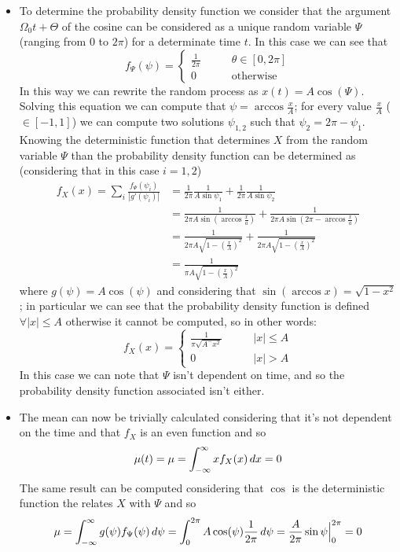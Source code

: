 	\begin{itemize}
		\item To determine the probability density function we consider that the argument $\Omega_0 t + \Theta$ of the cosine can be considered as a unique random variable $\Psi$ (ranging from $0$ to $2\pi$) for a determinate time $t$. In this case we can see that\[ f_\Psi(\psi) = \begin{cases}
			\frac 1 {2\pi} \qquad & \theta \in [0,2\pi] \\
			0 & \textrm{otherwise}
		\end{cases}\]
		In this way we can rewrite the random process as $x(t) = A \cos(\Psi)$. Solving this equation we can compute that $\psi = \arccos \frac xA$; for every value $\frac xA$ ($\in [-1,1]$) we can compute two solutions $\psi_{1,2}$ such that $\psi_2 = 2\pi - \psi_1$. Knowing the deterministic function that determines $X$ from the random variable $\Psi$ than the probability density function can be determined as (considering that in this case $i=1,2$)
		\begin{align*}
			f_X(x) = \sum_i \frac{f_\Psi(\psi_i)}{|g'(\psi_i)|} & = \frac{1}{2\pi}  \frac{1}{A\sin \psi_1} + \frac{1}{2\pi} \frac{1}{A\sin\psi_2} \\
			& = \frac{1}{2\pi A\sin \left(\arccos \frac{x}{a}\right)} + \frac{1}{2\pi A\sin \left(2\pi - \arccos \frac{x}{a}\right)} \\
			& = \frac{1}{2\pi A\sqrt{1 - \left(\frac x A\right)^2}} + \frac{1}{2\pi A\sqrt{1 - \left(\frac x A\right)^2}} \\ 
			&  = \frac{1}{\pi A\sqrt{1 - \left(\frac x A\right)^2}}
		\end{align*}
		where $g(\psi) =A \cos(\psi)$ and considering that $\sin(\arccos x) = \sqrt{1-x^2}$; in particular we can see that the probability density function is defined $\forall |x|\leq A$ otherwise it cannot be computed, so in other words:
		\[ f_X(x) = \begin{cases}
			\frac 1 {\pi \sqrt{A^-x^2}} \qquad & |x| \leq A \\ 0 & |x| > A
		\end{cases} \]
		In this case we can note that $\Psi$ isn't dependent on time, and so the probability density function associated isn't either.
		
		\item The mean can now be trivially calculated considering that it's not dependent on the time and that $f_X$ is an even function and so
		\[ \mu(t) = \mu= \int_{-\infty}^\infty x f_X(x)\, dx = 0\]
		The same result can be computed considering that $\cos$ is the deterministic function the relates $X$ with $\Psi$ and so
		\[ \mu = \int_{-\infty}^\infty g(\psi) f_\Psi(\psi)\, d\psi = \int_0^{2\pi} A \cos(\psi) \frac 1 {2\pi} \, d\psi = \frac A{2\pi} \sin\psi\Big|_0^{2\pi} = 0  \]
		

\end{itemize}
